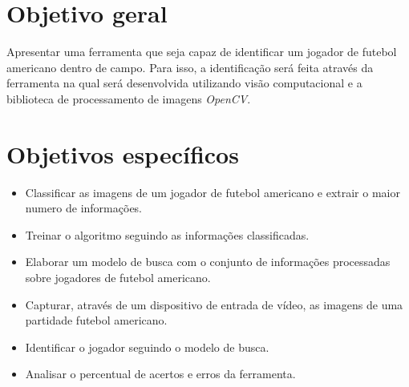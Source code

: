\section{\textbf{{Objetivo geral}}}
\label{objetivo-geral}
Apresentar uma ferramenta que seja capaz de identificar um jogador de futebol americano dentro de campo. Para isso, a identificação será feita através da ferramenta na qual será desenvolvida utilizando visão computacional e a biblioteca de processamento de imagens \textit{OpenCV}. 


\section{\textbf{{Objetivos específicos}}}
 \begin{itemize}
\item Classificar as imagens de um jogador de futebol americano e extrair o maior numero de informações.

\item Treinar o algoritmo seguindo as informações classificadas.

\item Elaborar um modelo de busca com o conjunto de informações processadas sobre jogadores de futebol americano.
   
\item Capturar, através de um dispositivo de entrada de vídeo, as imagens de uma partidade futebol americano.
   
\item Identificar o jogador seguindo o modelo de busca.
   
\item Analisar o percentual de acertos e erros da ferramenta.
   
 \end{itemize}
